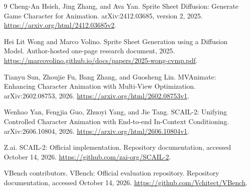 \documentclass[11pt]{article}
\begin{document}
\begin{thebibliography}{9}
Cheng-An Hsieh, Jing Zhang, and Ava Yan.
\newblock Sprite Sheet Diffusion: Generate Game Character for Animation.
\newblock arXiv:2412.03685, version 2, 2025.
\newblock \url{https://arxiv.org/html/2412.03685v2}.

Hei Lit Wong and Marco Volino.
\newblock Sprite Sheet Generation using a Diffusion Model.
\newblock Author-hosted one-page research document, 2025.
\newblock \url{https://marcovolino.github.io/docs/papers/2025-wong-cvmp.pdf}.

Tianyu Sun, Zhoujie Fu, Bang Zhang, and Guosheng Lin.
\newblock MVAnimate: Enhancing Character Animation with Multi-View Optimization.
\newblock arXiv:2602.08753, 2026.
\newblock \url{https://arxiv.org/html/2602.08753v1}.

Wenhao Yan, Fengjia Guo, Zhuoyi Yang, and Jie Tang.
\newblock SCAIL-2: Unifying Controlled Character Animation with End-to-end In-Context Conditioning.
\newblock arXiv:2606.10804, 2026.
\newblock \url{https://arxiv.org/html/2606.10804v1}.

Z.ai.
\newblock SCAIL-2: Official implementation.
\newblock Repository documentation, accessed October 14, 2026.
\newblock \url{https://github.com/zai-org/SCAIL-2}.

VBench contributors.
\newblock VBench: Official evaluation repository.
\newblock Repository documentation, accessed October 14, 2026.
\newblock \url{https://github.com/Vchitect/VBench}.
\end{thebibliography}
\end{document}
